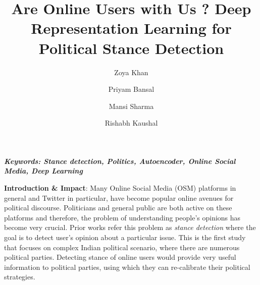 \documentclass[a4paper,12pt]{article}
\title{Are Online Users with Us ? Deep Representation Learning for Political Stance Detection}
\author[1]{Zoya Khan}\author[1]{Priyam Bansal} \author[1]{Mansi Sharma} \author[1]{Rishabh Kaushal}
\affil[1]{Indira Gandhi Delhi Technical University for Women, New Delhi, India}
\date{}
\begin{document}
\maketitle
\thispagestyle{fancy}
\vspace{-3em}
\begin{center}
\textbf{\textit{Keywords: Stance detection, Politics, Autoencoder, Online Social Media, Deep Learning}}
\end{center}

\textbf{Introduction \& Impact}: Many Online Social Media (OSM) platforms in general and Twitter in particular, have become popular online avenues for political discourse. 
Politicians and general public are both active on these platforms and therefore, the problem of understanding people's opinions has become very crucial.
Prior works \cite{lai2016friends,johnson2016identifying} refer this problem as \textit{stance detection} where the goal is to detect user's opinion about a particular issue.
This is the first study that focuses on complex Indian political scenario, where there are numerous political parties.
Detecting stance of online users would provide very useful information to political parties, using which they can re-calibrate their political strategies.
\end{document}

